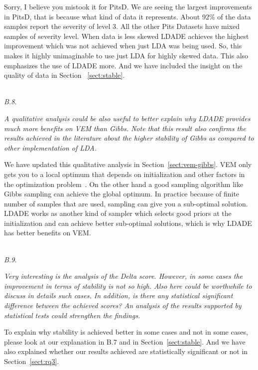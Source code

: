 \documentclass[twocolumn,5p,sort&compress]{elsarticle}
\newcommand{\tion}[1]{\ref{sect:#1}}
\theoremstyle{break}
\begin{document}
Sorry, I believe you mistook it for PitsD. We are seeing the largest improvements in PitsD, that is because what kind of data it represents. About 92\% of the data samples report the severity of level 3.  All the other Pits Datasets have mixed samples of severity level. When data is less skewed LDADE achieves the highest improvement which was not achieved when just LDA was being used. So, this makes it highly unimaginable to use just LDA for highly skewed data. This also emphasizes the use of LDADE more. And we have included the insight on the quality of data in Section ~\tion{stable}.

\noindent
\textit{\\B.8.} 

\textit{A qualitative analysis could be also useful to better explain why LDADE provides much more benefits on VEM than Gibbs. Note that this result also confirms the results achieved in the literature about the higher stability of Gibbs as compared to other implementation of LDA.\\}

We have updated this qualitative analysis in Section~\tion{vem-gibbs}. VEM only gets you to a local optimum that depends on initialization and other factors in the optimization problem~\cite{asuncion2009smoothing}. On the other hand a good sampling algorithm like Gibbs sampling can achieve the global optimum. In practice because of finite number of samples that are used, sampling can give you a sub-optimal solution. LDADE works as another kind of sampler which selects good priors at the initialization and can achieve better sub-optimal solutions, which is why LDADE has better benefits on VEM.

\noindent
\textit{\\B.9.} 

\textit{Very interesting is the analysis of the Delta score. However, in some cases the improvement in terms of stability is not so high. Also here could be worthwhile to discuss in details such cases. In addition, is there any statistical significant difference between the achieved scores? An analysis of the results supported by statistical tests could strengthen the findings.\\}

To explain why stability is achieved better in some cases and not in some cases, please look at our explanation in B.7 and in Section~\tion{stable}. And we have also explained whether our results achieved are statistically significant or not in Section~\tion{rq3}.
\end{document}
